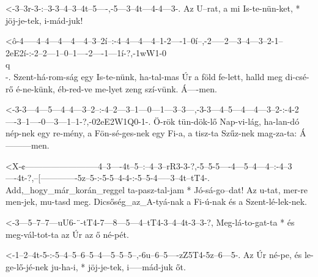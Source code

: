   {<-3--3r-3-:--3-3--4--3--4t--5----,-5---3--4t---4-4---3-.}
  {  Az U--rat, a mi Is-te-nün-ket, * jöj-je-tek, i-mád-juk!}


  {<ô-4-----4--4---4---4---4--3--2í--:-4--4---4---4--1-2----1--0í--,-2-----2---3--4---3--2-1--2eE2í-:-2--2---1--0--1----2----1---1í-?,-1wW1-0\\q\\-.}
  {   Szent-há-rom-ság egy Is-te-nünk, ha-tal-mas Úr a föld fe-lett, halld meg di-csé-rő é-ne-künk,   éb-red-ve me-lyet zeng szí-vünk. Á----men.}


  {<-3-3---4---5---4--4---3--2--:-4--2---3--1---0---1---3--3---,-3-3---4--5---4---4---3--2-:-4-2----3--1----0---3---1--1-?,-02eE2W1Q0-1-.}
  {  Ö-rök tün-dök-lő Nap-vi-lág, ha-lan-dó nép-nek egy re-mény, a Fön-sé-ges-nek egy Fi-a,  a tisz-ta Szűz-nek mag-za-ta:  Á---------men.}

  {<X-¢--------------------------4--3----4t--5--:--4--3--rR3-3-?,-5--5-5----4---5--4---4--:-4--3----4t-?,--[-------------5z--5-:-5-5--4-4-:-5--5-4-----3--4t--tT4-.}
  {   Add,_hogy_már_korán_reggel ta-pasz-tal-jam * Jó-sá-go--dat! Az u-tat, mer-re men-jek, mu-tasd meg.   Dicsőség_az_A-tyá-nak a Fi-ú-nak és a Szent-lé-lek-nek.}

  {<-3---5--7--7---uU6-¨-tT4-7---8---5---4--tT4-3--4--4t-3--3-?,}
  {  Meg-lá-to-gat-ta  * és  meg-vál-tot-ta az  Úr az ő  né-pét.}



  {<-1--2--4t-5-:-5--4--5--6--5--4---5--5--5--,-6u--6--5----zZ5T4-5z--6---5-.}
  {  Az Úr né-pe, és le-ge-lő-jé-nek ju-ha-i, * jöj-je-tek, i-----mád-juk őt.}

